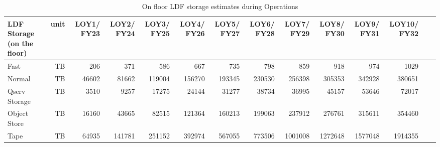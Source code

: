 \tiny \begin{longtable} { |p{}  |r  |r  |r  |r  |r  |r  |r  |r  |r  |r  |r  |r  |r |} 
\caption{On floor LDF storage estimates during Operations
 \label{tab:storageFloorOps}}\\ 
\hline 
\textbf{LDF Storage (on the floor)}&\textbf{unit}&\textbf{LOY1/ FY23}&\textbf{LOY2/ FY24}&\textbf{LOY3/ FY25}&\textbf{LOY4/ FY26}&\textbf{LOY5/ FY27}&\textbf{LOY6/ FY28}&\textbf{LOY7/ FY29}&\textbf{LOY8/ FY30}&\textbf{LOY9/ FY31}&\textbf{LOY10/ FY32}& \\ \hline
{Fast}&{TB}&{206}&{371}&{586}&{667}&{735}&{798}&{859}&{918}&{974}&{1029}& \\ \hline
{Normal}&{TB}&{46602}&{81662}&{119004}&{156270}&{193345}&{230530}&{256398}&{305353}&{342928}&{380651}& \\ \hline
{Qserv Storage}&{TB}&{3510}&{9257}&{17275}&{24144}&{31277}&{38734}&{36995}&{45157}&{53646}&{72017}& \\ \hline
{Object Store}&{TB}&{16160}&{43665}&{82515}&{121364}&{160213}&{199063}&{237912}&{276761}&{315611}&{354460}& \\ \hline
{Tape}&{TB}&{64935}&{141781}&{251152}&{392974}&{567055}&{773506}&{1001008}&{1272648}&{1577048}&{1914355}& \\ \hline
\end{longtable} \normalsize
